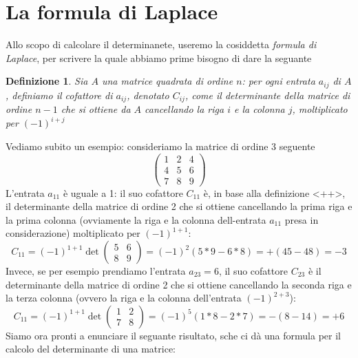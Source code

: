 \documentclass{book}
\newtheorem{definizione}{Definizione}
\begin{document}
\section{La formula di Laplace \label{Laplace}}
Allo scopo di calcolare il determinanete, useremo la cosiddetta \textit{formula di Laplace}, per scrivere la quale abbiamo prime bisogno di dare la seguante
\begin{definizione}
Sia $A$ una matrice quadrata di ordine $n$: per ogni entrata $a_{ij}$ di $A$, definiamo il \textit{cofattore di $a_{ij}$}, denotato $C_{ij}$, come il determinante della matrice di ordine $n-1$ che si ottiene da $A$ cancellando la riga $i$ e la colonna $j$, moltiplicato per $(-1)^{i+j}$
\end{definizione}
Vediamo subito un esempio: consideriamo la matrice di ordine 3 seguente
\begin{equation*}
  \begin{pmatrix}
    1 & 2 & 4 \\
    4 & 5 & 6 \\
    7 & 8 & 9
  \end{pmatrix}
\end{equation*}
L'entrata $a_{11}$ è uguale a 1: il suo cofattore $C_{11}$ è, in base alla definizione <++>, il determinante della matrice di ordine 2 che si ottiene cancellando la prima riga e la prima colonna (ovviamente la riga e la colonna dell-entrata $a_{11}$ presa in considerazione) moltiplicato per $(-1)^{1+1}$:
\begin{equation*}
	C_{11}=(-1)^{1+1}\det\begin{pmatrix} 5 & 6\\ 8 & 9 \end{pmatrix} = (-1)^2(5*9-6*8)=+(45-48)=-3
\end{equation*}
Invece, se per esempio prendiamo l'entrata $a_{23}=6$, il suo cofattore $C_{23}$ è il determinante della matrice di ordine 2 che si ottiene cancellando la seconda riga e la terza colonna (ovvero la riga e la colonna dell'entrata $(-1)^{2+3}$):
\begin{equation*}
	C_{11}=(-1)^{1+1}\det\begin{pmatrix} 1 & 2 \\ 7 & 8 \end{pmatrix} = (-1)^5(1*8-2*7)=-(8-14)=+6
\end{equation*}
Siamo ora pronti a enunciare il seguante risultato, sche ci dà una formula per il calcolo del determinante di una matrice:
\end{document}
